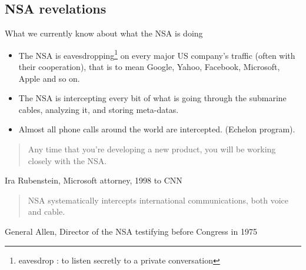 \documentclass[compress]{beamer}
\theoremstyle{definition}
\theoremstyle{definition}
\theoremstyle{definition}
\theoremstyle{remark}
\theoremstyle{remark}
\theoremstyle{definition}
\theoremstyle{definition}
\theoremstyle{definition}
\theoremstyle{definition}
\theoremstyle{definition}
\theoremstyle{remark}
\theoremstyle{remark}
\theoremstyle{remark}
\theoremstyle{remark}
\begin{document}
			\subsection{NSA revelations}
			\begin{frame}
				\begin{alertblock}{What we currently know about what the NSA is doing}
				\begin{itemize}[<+-| structure@+>]
	  			\item The NSA is eavesdropping\footnote{eavesdrop : to listen secretly to a private conversation} on every major US company's traffic (often with their cooperation), that is to mean Google, Yahoo, Facebook, Microsoft, Apple and so on. %
				\vspace*{7mm}
				\item The NSA is intercepting every bit of what is going through the submarine cables, analyzing it, and storing meta-datas.
				\vspace*{7mm}
				\item Almost all phone calls around the world are intercepted. (Echelon program).
				\vspace*{7mm}
				\end{itemize}
	 		\end{alertblock}
		\end{frame}
		\begin{frame}	
			\begin{quote}Any time that you're developing a new product, you will be working closely with the NSA.\end{quote} Ira Rubenstein, Microsoft attorney, 1998 to CNN
			\vspace{30mm}
			
			\begin{quote}NSA systematically intercepts international communications, both voice and cable.\end{quote} General Allen, Director of the NSA testifying before Congress in 1975
			\end{frame}
\end{document}
